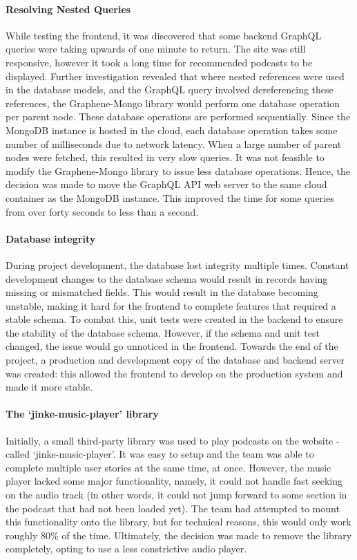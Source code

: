 \documentclass[../report.tex]{subfiles}
\begin{document}
\paragraph{Resolving Nested Queries}

While testing the frontend, it was discovered that some backend GraphQL queries were taking upwards of one minute to return.
The site was still responsive, however it took a long time for recommended podcasts to be displayed.
Further investigation revealed that where nested references were used in the database models, and the GraphQL query involved dereferencing these references, the Graphene-Mongo library would perform one database operation per parent node.
These database operations are performed sequentially.
Since the MongoDB instance is hosted in the cloud, each database operation takes some number of milliseconds due to network latency.
When a large number of parent nodes were fetched, this resulted in very slow queries.
It was not feasible to modify the Graphene-Mongo library to issue less database operations.
Hence, the decision was made to move the GraphQL API web server to the same cloud container as the MongoDB instance.
This improved the time for some queries from over forty seconds to less than a second.

\paragraph{Database integrity}

During project development, the database lost integrity multiple times.
Constant development changes to the database schema would result in records having missing or mismatched fields.
This would result in the database becoming unstable, making it hard for the frontend to complete features that required a stable schema.
To combat this, unit tests were created in the backend to ensure the stability of the database schema.
However, if the schema and unit test changed, the issue would go unnoticed in the frontend.
Towards the end of the project, a production and development copy of the database and backend server was created: this allowed the frontend to develop on the production system and made it more stable.

\paragraph{The `jinke-music-player' library}

Initially, a small third-party library was used to play podcasts on the website - called `jinke-music-player'.
It was easy to setup and the team was able to complete multiple user stories at the same time, at once.
However, the music player lacked some major functionality, namely, it could not handle fast seeking on the audio track (in other words, it could not jump forward to some section in the podcast that had not been loaded yet).
The team had attempted to mount this functionality onto the library, but for technical reasons, this would only work roughly 80\% of the time.
Ultimately, the decision was made to remove the library completely, opting to use a less constrictive audio player.
\end{document}
